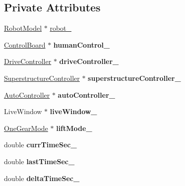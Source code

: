 \subsection*{Private Attributes}
\begin{DoxyCompactItemize}
\item 
\hyperlink{class_robot_model}{Robot\+Model} $\ast$ \hyperlink{class_main_program_a2d74d25ebc0a0bc52daa34a0048e071d}{robot\+\_\+}
\item 
\mbox{\label{class_main_program_a8b0df9956703e91662bef87dbe6552c6}} 
\hyperlink{class_control_board}{Control\+Board} $\ast$ {\bfseries human\+Control\+\_\+}
\item 
\mbox{\label{class_main_program_ad4224352ece515213597c083c02d89bc}} 
\hyperlink{class_drive_controller}{Drive\+Controller} $\ast$ {\bfseries drive\+Controller\+\_\+}
\item 
\mbox{\label{class_main_program_a0dfd4823ff497148a70f22b0dfccd230}} 
\hyperlink{class_superstructure_controller}{Superstructure\+Controller} $\ast$ {\bfseries superstructure\+Controller\+\_\+}
\item 
\mbox{\label{class_main_program_ac3d5377aaf3e901441354f9c9d641453}} 
\hyperlink{class_auto_controller}{Auto\+Controller} $\ast$ {\bfseries auto\+Controller\+\_\+}
\item 
\mbox{\label{class_main_program_abe37903ef51d2df9dc89f69a32e8da67}} 
Live\+Window $\ast$ {\bfseries live\+Window\+\_\+}
\item 
\mbox{\label{class_main_program_a3787d55d75893503e7f33f441676d193}} 
\hyperlink{class_one_gear_mode}{One\+Gear\+Mode} $\ast$ {\bfseries lift\+Mode\+\_\+}
\item 
\mbox{\label{class_main_program_a180a107906b59bbdadce0a366a952da5}} 
double {\bfseries curr\+Time\+Sec\+\_\+}
\item 
\mbox{\label{class_main_program_a6c22d1b8be27e874668c2cb240f0aaa8}} 
double {\bfseries last\+Time\+Sec\+\_\+}
\item 
\mbox{\label{class_main_program_a3259650f3390bc05a34f9ca2b58bc5bb}} 
double {\bfseries delta\+Time\+Sec\+\_\+}
\end{DoxyCompactItemize}


